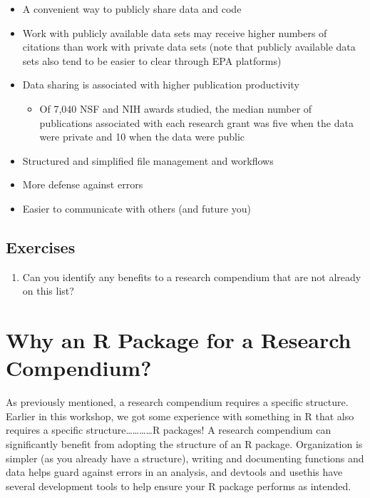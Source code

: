 \documentclass[
]{book}
\providecommand{\tightlist}{%
  \setlength{\itemsep}{0pt}\setlength{\parskip}{0pt}}
\begin{document}
\begin{itemize}
\tightlist
\item
  A convenient way to publicly share data and code
\item
  Work with publicly available data sets may receive higher numbers of citations than work with private data sets (note that publicly available data sets also tend to be easier to clear through EPA platforms)
\item
  Data sharing is associated with higher publication productivity

  \begin{itemize}
  \tightlist
  \item
    Of 7,040 NSF and NIH awards studied, the median number of publications associated with each research grant was five when the data were private and 10 when the data were public
  \end{itemize}
\item
  Structured and simplified file management and workflows
\item
  More defense against errors
\item
  Easier to communicate with others (and future you)
\end{itemize}

\hypertarget{ex-set8}{%
\subsection{Exercises}\label{ex-set8}}

\begin{enumerate}
\def\labelenumi{\arabic{enumi}.}
\tightlist
\item
  Can you identify any benefits to a research compendium that are not already on this list?
\end{enumerate}

\hypertarget{why-r-pack-for-rc}{%
\section{Why an R Package for a Research Compendium?}\label{why-r-pack-for-rc}}

As previously mentioned, a research compendium requires a specific structure. Earlier in this workshop, we got some experience with something in R that also requires a specific structure\ldots\ldots\ldots\ldots R packages! A research compendium can significantly benefit from adopting the structure of an R package. Organization is simpler (as you already have a structure), writing and documenting functions and data helps guard against errors in an analysis, and devtools and usethis have several development tools to help ensure your R package performs as intended.
\end{document}
